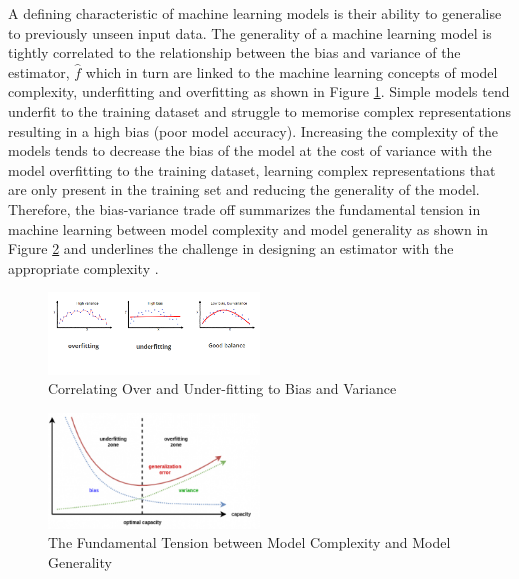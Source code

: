 \documentclass[../SMLreport_template.tex]{subfiles}
\begin{document}
A defining characteristic of machine learning models is their ability to generalise to previously unseen input data. The generality of a machine learning model is tightly correlated to the relationship between the bias and variance of the estimator, \(\hat{f}\) which in turn are linked to the machine learning concepts of model complexity, underfitting and overfitting as shown in Figure \ref{bias_var}. Simple models tend underfit to the training dataset and struggle to memorise complex representations resulting in a high bias (poor model accuracy). Increasing the complexity of the models tends to decrease the bias of the model at the cost of variance with the model overfitting to the training dataset, learning complex representations that are only present in the training set and reducing the generality of the model. Therefore, the bias-variance trade off summarizes the fundamental tension in machine learning between model complexity and model generality as shown in Figure \ref{cap} and underlines the challenge in designing an estimator with the appropriate complexity \cite{goodfellow-bengio-courville}\cite{mehta-wang-Day-Richardson}. 

\begin{figure}[t]
    \centering
    \includegraphics[width=0.5\textwidth]{sections/images/model_fitting.png}
    \caption{Correlating Over and Under-fitting to Bias and Variance}
    \label{bias_var}
\end{figure}
\newpage

\begin{figure}[t]
    \centering
    \includegraphics[width=0.5\textwidth]{sections/images/capacity.png}
    \caption{The Fundamental Tension between Model Complexity and Model Generality}
    \label{cap}
\end{figure}
\end{document}
